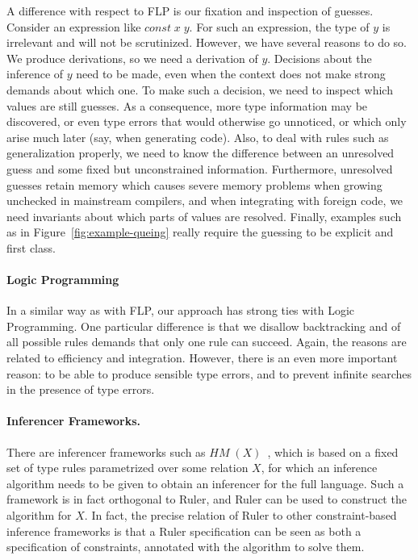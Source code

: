 \documentclass[preprint,natbib]{sigplanconf}
\newcommand{\Conid}[1]{\mathit{#1}}
\newcommand{\Varid}[1]{\mathit{#1}}
\begin{document}
    A difference with respect to FLP is our fixation and inspection of guesses. Consider an expression like \ensuremath{\Varid{const}\;\Varid{x}\;\Varid{y}}.
    For such an expression, the type of \ensuremath{\Varid{y}} is irrelevant and will not be scrutinized. However, we have several reasons to
    do so. We produce derivations, so we need a derivation of \ensuremath{\Varid{y}}. Decisions about the inference of \ensuremath{\Varid{y}} need to be made, even
    when the context does not make strong demands about which one. To make such a decision, we need to inspect which values
    are still guesses. As a consequence, more type information may be discovered, or even type errors that would otherwise go
    unnoticed, or which only arise much later (say, when generating code). Also, to deal with
    rules such as generalization properly, we need to know the difference between an unresolved guess and some fixed but
    unconstrained information. Furthermore, unresolved guesses retain memory which causes severe memory problems when growing
    unchecked in mainstream compilers, and when integrating with foreign code, we need invariants about which parts of values
    are resolved. Finally, examples such as in Figure~\ref{fig:example-queing} really require the guessing to be explicit and
    first class.

    \paragraph{Logic Programming}
    In a similar way as with FLP, our approach has strong ties with Logic Programming. One particular difference is that we
    disallow backtracking and of all possible rules demands that only one rule can succeed. Again, the reasons are related to
    efficiency and integration. However, there is an even more important reason: to be able to produce sensible type errors,
    and to prevent infinite searches in the presence of type errors.

    \paragraph{Inferencer Frameworks.}
    There are inferencer frameworks such as \ensuremath{\Conid{HM}\;(\Conid{X})}~\cite{DBLP:journals/jfp/SulzmannS08}, which is based on a fixed set of type
    rules parametrized over some relation \ensuremath{\Conid{X}}, for which an inference algorithm needs to be given to obtain an inferencer for
    the full language. Such a framework is in fact orthogonal to Ruler, and Ruler can be used to construct the algorithm for
    \ensuremath{\Conid{X}}. In fact, the precise relation of Ruler to other constraint-based inference frameworks is that a Ruler specification
    can be seen as both a specification of constraints, annotated with the algorithm to solve them.
\end{document}

